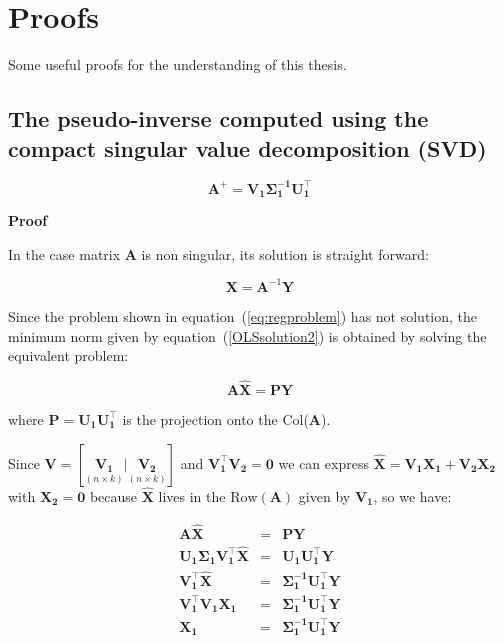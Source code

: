\chapter{Proofs}
Some useful proofs for the understanding of this thesis.
\section{The pseudo-inverse computed using the compact
singular value decomposition (SVD)} \label{app:pseudoproof}
\begin{equation}
\mathbf{A}^+ = \mathbf{V_1\Sigma_1^{-1}U_1^\top}
\end{equation}

\textbf{Proof}\quad

In the case matrix $\mathbf{A}$ is non singular, its solution is
straight forward:

\begin{equation}
\label{OLSsolution2}
    \mathbf{\mathbf{X}}=\mathbf{A}^{-1}\mathbf{Y}
\end{equation}


Since the problem shown in equation~(\ref{eq:regproblem}) has not
solution, the minimum norm given by equation~(\ref{OLSsolution2}) is
obtained by solving the equivalent problem:

\begin{equation*}
\label{eq:proyectorsol}
\mathbf{A \hat{\mathbf{X}} = PY} 
\end{equation*}


\noindent where $\mathbf{P=U_1 U_1^\top}$ is the projection onto the
Col($\mathbf{A}$). 

Since $\mathbf{V} = [\underset{(n \times k)}{\mathbf{V_1}} |
\underset{(n \times k)}{\mathbf{V_2}}]$ and $\mathbf{V_1^\top V_2 =
0}$ we can express $\mathbf{\hat{\mathbf{X}}} = \mathbf{V_1 \mathbf{X}_1 + V_2 \mathbf{X}_2}$
with $\mathbf{\mathbf{X}_2=0}$ because $\mathbf{\hat{\mathbf{X}}}$ lives in the
$\text{Row}(\mathbf{A})$ given by $\mathbf{V_1}$, so we have:

\begin{eqnarray*}
\mathbf{A \hat{\mathbf{X}}} &=& \mathbf{PY} \\
\mathbf{U_1 \Sigma_1 V_1^\top \hat{\mathbf{X}}} &=& \mathbf{U_1 U_1^\top Y} \\
\mathbf{ V_1^\top \hat{\mathbf{X}}} &=&  \mathbf{\Sigma_1^{-1} U_1^\top Y} \\ 
\mathbf{ V_1^\top V_1 \mathbf{X}_1} &=& \mathbf{\Sigma_1^{-1}
U_1^\top Y} \\
\mathbf{\mathbf{X}_1}&=& \mathbf{\Sigma_1^{-1} U_1^\top Y}
\end{eqnarray*}

